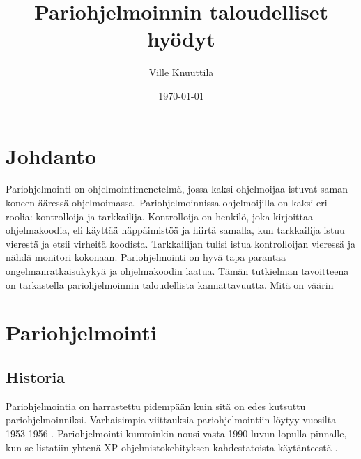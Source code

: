 \documentclass[finnish]{tktltiki2}
\title{Pariohjelmoinnin taloudelliset hyödyt}
\author{Ville Knuuttila}
\date{\today}
\theoremstyle{definition}
\theoremstyle{remark}
\begin{document}

\maketitle        %
\makeabstract     %

\tableofcontents  %
\newpage          %



\section{Johdanto}
Pariohjelmointi on ohjelmointimenetelmä, jossa kaksi ohjelmoijaa istuvat saman koneen ääressä ohjelmoimassa.\cite{pairprogramming2} Pariohjelmoinnissa ohjelmoijilla on kaksi eri roolia: kontrolloija ja tarkkailija. Kontrolloija on henkilö, joka kirjoittaa ohjelmakoodia, eli käyttää näppäimistöä ja hiirtä samalla, kun tarkkailija istuu vierestä ja etsii virheitä koodista. Tarkkailijan tulisi istua kontrolloijan vieressä ja nähdä monitori kokonaan. 
\newline
Pariohjelmointi on hyvä tapa parantaa ongelmanratkaisukykyä ja ohjelmakoodin laatua\cite{pairprogramming}. Tämän tutkielman tavoitteena on tarkastella pariohjelmoinnin taloudellista kannattavuutta.
Mitä on väärin~\cite{meta}

\section{Pariohjelmointi}
\subsection{Historia}
Pariohjelmointia on harrastettu pidempään kuin sitä on edes kutsuttu pariohjelmoinniksi.\cite{williams03pair} Varhaisimpia viittauksia pariohjelmointiin löytyy vuosilta 1953-1956 \cite{williams96pair}.
Pariohjelmointi kumminkin nousi vasta 1990-luvun lopulla pinnalle, kun se listatiin yhtenä XP-ohjelmistokehityksen kahdestatoista käytänteestä \cite{beck00extreme}.
\end{document}
